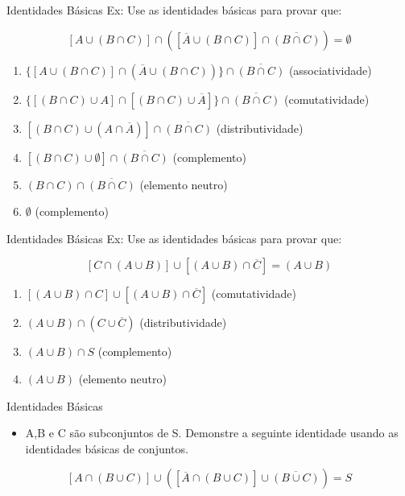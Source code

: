 \documentclass[aspectratio=169]{beamer}
\begin{document}
\begin{frame}{Identidades Básicas}
    Ex: Use as identidades básicas para provar que:

\[
[A \cup (B \cap C)] \cap ([\overline{A} \cup (B \cap C)] \cap \overline{(B \cap C)}) = \emptyset
\]

\begin{enumerate}
    \item $\{[A \cup (B \cap C)] \cap (\overline{A} \cup (B \cap C))\} \cap \overline{(B \cap C)}$ \hspace{0.5cm} (associatividade)
    \item $\{[(B \cap C) \cup A] \cap [(B \cap C) \cup \overline{A}]\} \cap \overline{(B \cap C)}$ \hspace{0.5cm} (comutatividade)
    \item $[(B \cap C) \cup (A \cap \overline{A})] \cap \overline{(B \cap C)}$ \hspace{0.5cm} (distributividade)
    \item $[(B \cap C) \cup \emptyset] \cap \overline{(B \cap C)}$ \hspace{0.5cm} (complemento)
    \item $(B \cap C) \cap \overline{(B \cap C)}$ \hspace{0.5cm} (elemento neutro)
    \item $\emptyset$ \hspace{0.5cm} (complemento)
\end{enumerate}
\end{frame}

\begin{frame}{Identidades Básicas}
    Ex: Use as identidades básicas para provar que:

    
\[
    [C \cap (A \cup B)] \cup [(A \cup B) \cap \overline{C}] = (A \cup B)
\]

\pause

\begin{enumerate}
    \item $[(A \cup B) \cap C] \cup [(A \cup B) \cap \overline{C}]$ (comutatividade)
    \item $(A \cup B) \cap (C \cup \overline{C})$ (distributividade)
    \item $(A \cup B) \cap S$ (complemento)
    \item $(A \cup B)$ (elemento neutro)
\end{enumerate}
\end{frame}

\begin{frame}{Identidades Básicas}
\begin{itemize}
    \item A,B e C são subconjuntos de S. Demonstre a seguinte identidade usando as identidades básicas de conjuntos.
\end{itemize}

\[ [A \cap (B \cup C)] \cup ([\overline{A} \cap (B \cup C)] \cup \overline{(B \cup C)}) = S \]
\end{frame}
\end{document}
